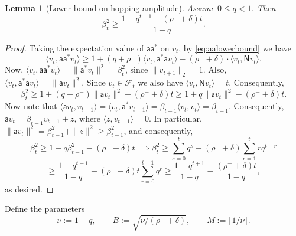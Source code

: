 \documentclass
[11pt,letterpaper]
{article}
\newtheorem{lemma}[theorem]{Lemma}
\theoremstyle{definition}
\newcommand{\sfa}{\mathsf a}
\newcommand{\Num}{\mathsf N}
\newcommand{\cF}{{\mathcal F}}
\newcommand{\1}{\mathbf{1}}
\renewcommand{\geq}{\geqslant}
\renewcommand{\le}{\leqslant}
\begin{document}
\begin{lemma}[Lower bound on hopping amplitude]\label{lem:betam}
    Assume $0 \le q < 1$. Then 
    \[\beta_t^2\geq\frac{1 - q^{t + 1} - (\rho^- + \delta)t}{1 - q}.\]
\end{lemma}
\begin{proof}
    Taking the expectation value of $\sfa\sfa^*$ on $v_t$, by \eqref{eq:aalowerbound} we have 
    \[\langle v_t, \sfa\sfa^*v_t\rangle\geq 1 + (q + \rho^-)\langle v_t, \sfa^*\sfa v_t\rangle - (\rho^- + \delta)\cdot\langle v_t, \Num v_t\rangle.\]
    Now, $\langle v_t, \sfa\sfa^*v_t\rangle = \|\sfa^*v_t\|^2 = \beta_t^2$, since $\|v_{t + 1}\|_2 = 1$. Also, $\langle v_t, \sfa^*\sfa v_t\rangle = \|\sfa v_t\|^2$. Since $v_t\in\cF_t$ we also have $\langle v_t, \Num v_t\rangle = t$. Consequently, 
    \[\beta_t^2\geq 1 + (q + \rho^-)\|\sfa v_t\|^2 - (\rho^- + \delta)t\geq  1 + q\| \sfa v_t\|^2 - (\rho^- + \delta)t.\]
    Now note that $\langle \sfa v_t, v_{t - 1}\rangle = \langle v_t, \sfa ^*v_{t - 1}\rangle = \beta_{t - 1}\langle v_t, v_t\rangle = \beta_{t - 1}$. Consequently, $\sfa v_t = \beta_{t - 1}v_{t - 1} + z$, where $\langle z, v_{t - 1}\rangle = 0$. In particular, $\|\sfa v_t\|^2 = \beta_{t - 1}^2 + \|z\|^2\geq\beta_{t - 1}^2$, and consequently, 
    \[\beta_t^2\geq 1 + q\beta_{t - 1}^2 - (\rho^- + \delta)t\implies\beta_t^2\geq\sum_{s = 0}^t q^s - (\rho^- + \delta)\sum_{r = 1}^t rq^{t - r}\] 
    \[\geq\frac{1 - q^{t + 1}}{1 - q} - (\rho^- + \delta)t\sum_{r = 0}^{t - 1}q^r\geq\frac{1 - q^{t + 1}}{1 - q} - \frac{(\rho^- + \delta)t}{1 - q},\]
    as desired.
\end{proof}

Define the parameters
\begin{equation}\label{eq:main-params}
    \nu := 1-q,\qquad B:= \sqrt{\nu/(\rho^- + \delta)},\qquad M:= \lfloor 1/\nu\rfloor.
\end{equation}
\end{document}
